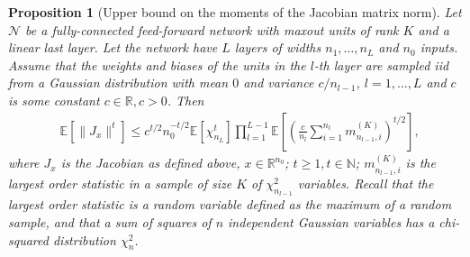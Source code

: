 \documentclass{article}
\newtheorem{proposition}[theorem]{Proposition}
\theoremstyle{definition}
\newcommand{\net}{\mathcal{N}}
\newcommand{\nin}{n_0}
\begin{document}
\begin{proposition}[Upper bound on the moments of the Jacobian matrix norm]
    \label{prop:jacobian_upper}
    Let $\net$ be a fully-connected feed-forward network with maxout units of rank $K$ and a linear last layer. 
    Let the network have $L$ layers of widths $n_1, \ldots, n_L$ and $\nin$ inputs. 
    Assume that the weights and biases of the units in the $l$-th layer are sampled iid from a Gaussian distribution with mean $0$ and variance $c / n_{l-1}$, $l = 1, \ldots, L$ and $c$ is some constant $c \in \mathbb{R}, c > 0$. Then 
    \begin{align*}
        &\mathbb{E}[\| J_x \|^t] \leq 
        c^{t/2} n_0^{-t/2} \mathbb{E}[\chi_{n_{L}}^t]  \prod_{l = 1}^{L-1} \mathbb{E} \left[ \left( \frac{c}{n_l} \sum_{i=1}^{n_l}  m^{(K)}_{n_{l-1}, i} \right)^{t/2} \right],
    \end{align*}
    where $J_x$ is the Jacobian as defined above, $x \in \mathbb{R}^{n_0}$; $t \geq 1, t \in \mathbb{N}$; 
    $m^{(K)}_{n_{l-1}, i}$ is the largest order statistic in a sample of size $K$ of $\chi_{n_{l-1}}^2$ variables. 
    Recall that the largest order statistic is a random variable defined as the maximum of a random sample, and that a sum of squares of $n$ independent Gaussian variables has a chi-squared distribution $\chi_n^2$. 
\end{proposition}
\end{document}
